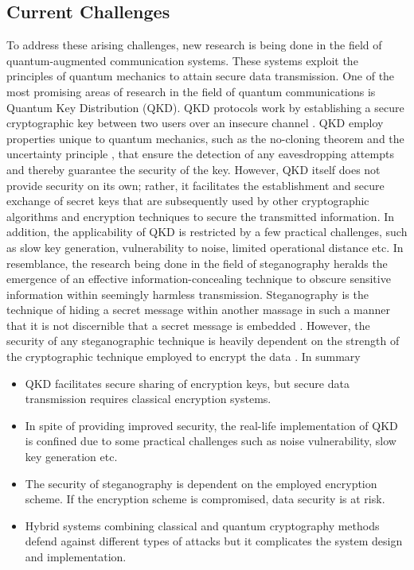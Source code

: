 \documentclass[a4paper]{cas-sc}
\begin{document}
\subsection{Current Challenges}
To address these arising challenges, new research is being done in the field of quantum-augmented communication systems. These systems exploit the principles of quantum mechanics to attain secure data transmission. One of the most promising areas of research in the field of quantum communications is Quantum Key Distribution (QKD). QKD protocols work by establishing a secure cryptographic key between two users over an insecure channel \cite{alleaume2014using}. QKD employ properties unique to quantum mechanics, such as the no-cloning theorem \cite{buvzek1996quantum} and the uncertainty principle \cite{sen2014uncertainty}, that ensure the detection of any eavesdropping attempts and thereby guarantee the security of the key. However, QKD itself does not provide security on its own; rather, it facilitates the establishment and secure exchange of secret keys that are subsequently used by other cryptographic algorithms and encryption techniques to secure the transmitted information. In addition, the applicability of QKD is restricted by a few practical challenges, such as slow key generation, vulnerability to noise, limited operational distance etc. In resemblance, the research being done in the field of steganography heralds the emergence of an effective information-concealing technique to obscure sensitive information within seemingly harmless transmission. Steganography is the technique of hiding a secret message within another massage in such a manner that it is not discernible that a secret message is embedded \cite{Kahn1996}. However, the security of any steganographic technique is heavily dependent on the strength of the cryptographic technique employed to encrypt the data \cite{anderson1998limits}. In summary
\begin{itemize}
    \item QKD facilitates secure sharing of encryption keys, but secure data transmission requires classical encryption systems.
    \item In spite of providing improved security, the real-life implementation of QKD is confined due to some practical challenges such as noise vulnerability, slow key generation etc.
    \item The security of steganography is dependent on the employed encryption scheme. If the encryption scheme is compromised, data security is at risk.
    \item Hybrid systems combining classical and quantum cryptography methods defend against different types of attacks but it complicates the system design and implementation.
\end{itemize}
\end{document}
